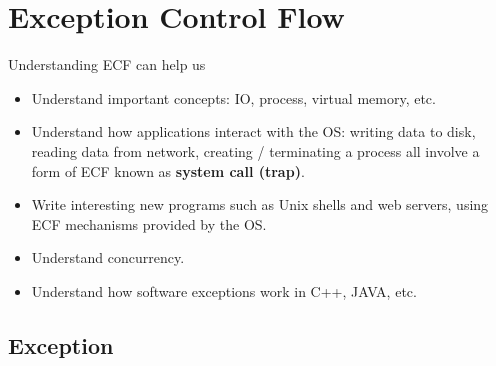 \ifx\PREAMBLE\undefined


\fi
\newpage
\section{Exception Control Flow}
Understanding ECF can help us
\begin{itemize}
\item Understand important concepts: IO, process, virtual memory, etc.
\item Understand how applications interact with the OS: writing data to disk, reading data from network, creating / terminating a process all involve a form of ECF known as \textbf{system call (trap)}.
\item Write interesting new programs such as Unix shells and web servers, using ECF mechanisms provided by the OS.
\item Understand concurrency.
\item Understand how software exceptions work in C++, JAVA, etc.
\end{itemize}
\subsection{Exception}
